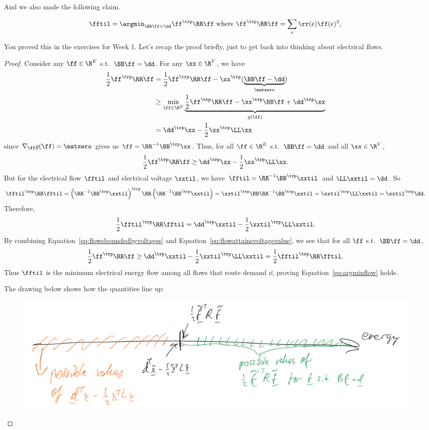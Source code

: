 And we also made the following claim.
\begin{claim}
  \begin{equation}
    \label{eq:argminflow}
    \fftil = \argmin_{\BB\ff=\dd} \ff^\trp\RR\ff \text{ where }
    \ff^\trp\RR\ff=\sum_e \rr(e)\ff(e)^2,
  \end{equation}
\end{claim}
You proved this in the exercises for Week 1. Let's recap the proof
briefly, just to get back into thinking about electrical flows.
\begin{proof}
Consider any $\ff\in\R^E$ s.t.\ $\BB\ff=\dd$. For any $\xx\in\R^V$, we have
\begin{align*}
	\frac{1}{2}\ff^\trp\RR\ff
	&= \frac{1}{2}\ff^\trp\RR\ff  - \xx^\trp(\underbrace{\BB\ff-\dd}_{\matzero}) \\
	&\geq \min_{\ff\in\R^E} \underbrace{\frac{1}{2}\ff^\trp\RR\ff  - \xx^\trp\BB\ff + \dd^\trp\xx}_{g(\ff)}  \\
	&= \dd^\trp\xx - \frac{1}{2}\xx^\trp\LL\xx
\end{align*}
since $\nabla_{\ff}g(\ff) = \matzero$ gives us $\ff=\RR^{-1}\BB^\trp\xx$. Thus, for all $\ff\in\R^E$ s.t.\ $\BB\ff=\dd$ and all $\xx\in\R^V$,
\begin{equation}
  \label{eq:flowsboundedbyvoltages}
\frac{1}{2}\ff^\trp\RR\ff \geq \dd^\trp\xx -
  \frac{1}{2}\xx^\trp\LL\xx.
\end{equation}
But for the electrical flow $\fftil$ and electrical voltage $\xxtil$, we have $\fftil=\RR^{-1}\BB^\trp\xxtil$ and $\LL\xxtil=\dd$. So
\[ \fftil^\trp\RR\fftil = \left(\RR^{-1}\BB^\trp\xxtil\right)^\trp\RR\left(\RR^{-1}\BB^\trp\xxtil\right) = \xxtil^\trp\BB\RR^{-1}\BB^\trp\xxtil = \xxtil^\trp\LL\xxtil  =\xxtil^\trp\dd. \]
Therefore,
\begin{equation}
   \label{eq:flowattainsvoltagevalue}
\frac{1}{2}\fftil^\trp\RR\fftil = \dd^\trp\xxtil -
\frac{1}{2}\xxtil^\trp\LL\xxtil.
\end{equation}
 By combining Equation~\eqref{eq:flowsboundedbyvoltages} and
 Equation~\eqref{eq:flowattainsvoltagevalue}, we see that for all
 $\ff$ s.t.\ $\BB \ff = \dd$,
 \[
 \frac{1}{2}\ff^\trp\RR\ff \geq \dd^\trp\xxtil -
\frac{1}{2}\xxtil^\trp\LL\xxtil = \frac{1}{2}\fftil^\trp\RR\fftil.
\]
Thus $\fftil$ is the minimum electrical energy flow among all flows
that route demand $\dd$, proving Equation~\eqref{eq:argminflow} holds.

The drawing below shows how the quantities line up:
\begin{figure}[H]
  \centering
     \includegraphics[width=\textwidth]{fig/lecture6_maxminfig.jpeg}
\label{fig:dualregions}
\end{figure}
\end{proof}



